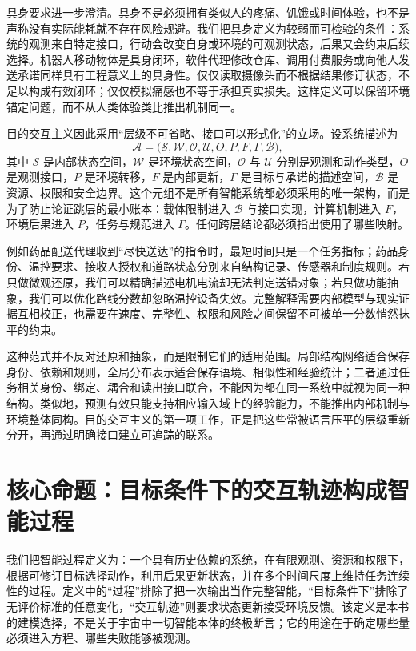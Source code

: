 具身要求进一步澄清。具身不是必须拥有类似人的疼痛、饥饿或时间体验，也不是声称没有实际能耗就不存在风险规避。我们把具身定义为较弱而可检验的条件：系统的观测来自特定接口，行动会改变自身或环境的可观测状态，后果又会约束后续选择。机器人移动物体是具身闭环，软件代理修改仓库、调用付费服务或向他人发送承诺同样具有工程意义上的具身性。仅仅读取摄像头而不根据结果修订状态，不足以构成有效闭环；仅仅模拟痛感也不等于承担真实损失。这样定义可以保留环境锚定问题，而不从人类体验类比推出机制同一。

目的交互主义因此采用“层级不可省略、接口可以形式化”的立场。设系统描述为
\begin{equation}
  \mathcal A=\bigl(\mathcal S,\mathcal W,\mathcal O,\mathcal U,
  O,P,F,\Gamma,\mathcal B\bigr),
\end{equation}
其中 $\mathcal S$ 是内部状态空间，$\mathcal W$ 是环境状态空间，$\mathcal O$ 与 $\mathcal U$ 分别是观测和动作类型，$O$ 是观测接口，$P$ 是环境转移，$F$ 是内部更新，$\Gamma$ 是目标与承诺的描述空间，$\mathcal B$ 是资源、权限和安全边界。这个元组不是所有智能系统都必须采用的唯一架构，而是为了防止论证跳层的最小账本：载体限制进入 $\mathcal B$ 与接口实现，计算机制进入 $F$，环境后果进入 $P$，任务与规范进入 $\Gamma$。任何跨层结论都必须指出使用了哪些映射。

例如药品配送代理收到“尽快送达”的指令时，最短时间只是一个任务指标；药品身份、温控要求、接收人授权和道路状态分别来自结构记录、传感器和制度规则。若只做微观还原，我们可以精确描述电机电流却无法判定送错对象；若只做功能抽象，我们可以优化路线分数却忽略温控设备失效。完整解释需要内部模型与现实证据互相校正，也需要在速度、完整性、权限和风险之间保留不可被单一分数悄然抹平的约束。

这种范式并不反对还原和抽象，而是限制它们的适用范围。局部结构网络适合保存身份、依赖和规则，全局分布表示适合保存语境、相似性和经验统计；二者通过任务相关身份、绑定、耦合和读出接口联合，不能因为都在同一系统中就视为同一种结构。类似地，预测有效只能支持相应输入域上的经验能力，不能推出内部机制与环境整体同构。目的交互主义的第一项工作，正是把这些常被语言压平的层级重新分开，再通过明确接口建立可追踪的联系。

\section{核心命题：目标条件下的交互轨迹构成智能过程}
\label{sec:section_5723}

我们把智能过程定义为：一个具有历史依赖的系统，在有限观测、资源和权限下，根据可修订目标选择动作，利用后果更新状态，并在多个时间尺度上维持任务连续性的过程。定义中的“过程”排除了把一次输出当作完整智能，“目标条件下”排除了无评价标准的任意变化，“交互轨迹”则要求状态更新接受环境反馈。该定义是本书的建模选择，不是关于宇宙中一切智能本体的终极断言；它的用途在于确定哪些量必须进入方程、哪些失败能够被观测。


